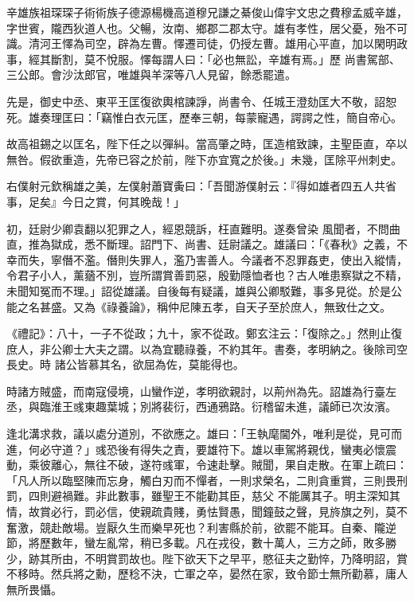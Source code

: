 
\begin{pinyinscope}

 辛雄族祖琛琛子術術族子德源楊機高道穆兄謙之綦俊山偉宇文忠之費穆孟威辛雄，字世賓，隴西狄道人也。父暢，汝南、鄉郡二郡太守。雄有孝性，居父憂，殆不可識。清河王懌為司空，辟為左曹。懌遷司徒，仍授左曹。雄用心平直，加以閑明政事，經其斷割，莫不悅服。懌每謂人曰：「必也無訟，辛雄有焉。」歷
 尚書駕部、三公郎。會沙汰郎官，唯雄與羊深等八人見留，餘悉罷遣。



 先是，御史中丞、東平王匡復欲輿棺諫諍，尚書令、任城王澄劾匡大不敬，詔恕死。雄奏理匡曰：「竊惟白衣元匡，歷奉三朝，每蒙寵遇，諤諤之性，簡自帝心。



 故高祖錫之以匡名，陛下任之以彈糾。當高肇之時，匡造棺致諫，主聖臣直，卒以無咎。假欲重造，先帝已容之於前，陛下亦宜寬之於後。」未幾，匡除平州刺史。



 右僕射元欽稱雄之美，左僕射蕭寶夤曰：「吾聞游僕射云：『得如雄者四五人共省事，足矣』今日之賞，何其晚哉！」



 初，廷尉少卿袁翻以犯罪之人，經恩競訴，枉直難明。遂奏曾染
 風聞者，不問曲直，推為獄成，悉不斷理。詔門下、尚書、廷尉議之。雄議曰：「《春秋》之義，不幸而失，寧僭不濫。僭則失罪人，濫乃害善人。今議者不忍罪姦吏，使出入縱情，令君子小人，薰蕕不別，豈所謂賞善罰惡，殷勤隱恤者也？古人唯患察獄之不精，未聞知冤而不理。」詔從雄議。自後每有疑議，雄與公卿駁難，事多見從。於是公能之名甚盛。又為《祿養論》，稱仲尼陳五孝，自天子至於庶人，無致仕之文。



 《禮記》：八十，一子不從政；九十，家不從政。鄭玄注云：「復除之。」然則止復庶人，非公卿士大夫之謂。以為宜聽祿養，不約其年。書奏，孝明納之。後除司空長史。時
 諸公皆慕其名，欲屈為佐，莫能得也。



 時諸方賊盛，而南寇侵境，山蠻作逆，孝明欲親討，以荊州為先。詔雄為行臺左丞，與臨淮王彧東趣葉城；別將裴衍，西通鴉路。衍稽留未進，議師已次汝濱。



 逢北溝求救，議以處分道別，不欲應之。雄曰：「王執麾閫外，唯利是從，見可而進，何必守道？」彧恐後有得失之責，要雄符下。雄以車駕將親伐，蠻夷必懷震動，乘彼離心，無往不破，遂符彧軍，令速赴擊。賊聞，果自走散。在軍上疏曰：「凡人所以臨堅陳而忘身，觸白刃而不憚者，一則求榮名，二則貪重賞，三則畏刑罰，四則避禍難。非此數事，雖聖王不能勸其臣，慈父
 不能厲其子。明主深知其情，故賞必行，罰必信，使親疏貴賤，勇怯賢愚，聞鐘鼓之聲，見旍旗之列，莫不奮激，競赴敵場。豈厭久生而樂早死也？利害縣於前，欲罷不能耳。自秦、隴逆節，將歷數年，蠻左亂常，稍已多載。凡在戎役，數十萬人，三方之師，敗多勝少，跡其所由，不明賞罰故也。陛下欲天下之早平，愍征夫之勤悴，乃降明詔，賞不移時。然兵將之勳，歷稔不決，亡軍之卒，晏然在家，致令節士無所勸慕，庸人無所畏懾。




\end{pinyinscope}
